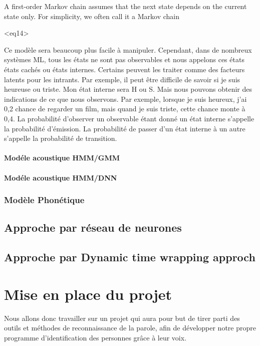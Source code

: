\documentclass[a4paper, 12pt]{book}
\newcounter{program}[subsection]
\begin{document}
A first-order Markov chain assumes that the next state depends on the current state only. For simplicity, we often call it a Markov chain

<eq14>

Ce modèle sera beaucoup plus facile à manipuler. Cependant, dans de nombreux systèmes ML, tous les états ne sont pas observables et nous appelons ces états états cachés ou états internes. Certains peuvent les traiter comme des facteurs latents pour les intrants. Par exemple, il peut être difficile de savoir si je suis heureuse ou triste. Mon état interne sera {H ou S}. Mais nous pouvons obtenir des indications de ce que nous observons. Par exemple, lorsque je suis heureux, j'ai 0,2 chance de regarder un film, mais quand je suis triste, cette chance monte à 0,4. La probabilité d'observer un observable étant donné un état interne s'appelle la probabilité d'émission. La probabilité de passer d'un état interne à un autre s'appelle la probabilité de transition.

\subsubsection{Modéle acoustique HMM/GMM}

\subsubsection{Modéle acoustique HMM/DNN}

\subsection{Modèle Phonétique}

\section{Approche par réseau de neurones}

\section{Approche par Dynamic time wrapping approch}


\chapter{Mise en place du projet}

Nous allons donc travailler sur un projet qui aura pour but de tirer parti des outils et méthodes de reconnaissance de la parole, afin de développer notre propre programme d'identification des personnes grâce à leur voix.
\end{document}
